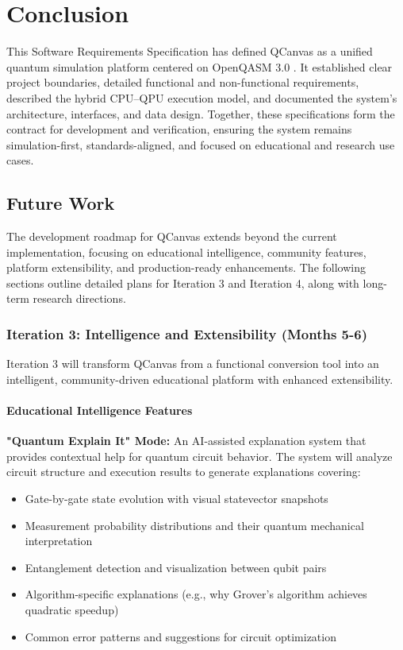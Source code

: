 \chapter{Conclusion}

This Software Requirements Specification has defined QCanvas as a unified quantum simulation platform centered on OpenQASM 3.0 \cite{cross2021openqasm}. It established clear project boundaries, detailed functional and non-functional requirements, described the hybrid CPU–QPU execution model, and documented the system's architecture, interfaces, and data design. Together, these specifications form the contract for development and verification, ensuring the system remains simulation-first, standards-aligned, and focused on educational and research use cases.

\section{Future Work}

The development roadmap for QCanvas extends beyond the current implementation, focusing on educational intelligence, community features, platform extensibility, and production-ready enhancements. The following sections outline detailed plans for Iteration 3 and Iteration 4, along with long-term research directions.

\subsection{Iteration 3: Intelligence and Extensibility (Months 5-6)}

Iteration 3 will transform QCanvas from a functional conversion tool into an intelligent, community-driven educational platform with enhanced extensibility.

\subsubsection{Educational Intelligence Features}

\textbf{"Quantum Explain It" Mode:} An AI-assisted explanation system that provides contextual help for quantum circuit behavior. The system will analyze circuit structure and execution results to generate explanations covering:
\begin{itemize}
    \item Gate-by-gate state evolution with visual statevector snapshots
    \item Measurement probability distributions and their quantum mechanical interpretation
    \item Entanglement detection and visualization between qubit pairs
    \item Algorithm-specific explanations (e.g., why Grover's algorithm achieves quadratic speedup)
    \item Common error patterns and suggestions for circuit optimization
\end{itemize}

